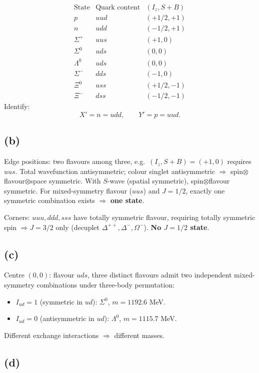 \documentclass[11pt]{article}
\begin{document}
\[ \begin{array}{l|c|c}
\text{State} & \text{Quark content} & (I_z, S+B) \\\hline
p & uud & (+1/2,+1) \\
n & udd & (-1/2,+1) \\
\Sigma^+ & uus & (+1,0) \\
\Sigma^0 & uds & (0,0) \\
\Lambda^0 & uds & (0,0) \\
\Sigma^- & dds & (-1,0) \\
\Xi^0 & uss & (+1/2,-1) \\
\Xi^- & dss & (-1/2,-1)
\end{array} \]
Identify:
\[ \boxed{\;X' = n = udd,\qquad Y' = p = uud.\;} \]

\subsection*{(b)}

Edge positions: two flavours among three, e.g.\ $(I_z,S+B)=(+1,0)$ requires $uus$. Total wavefunction antisymmetric; colour singlet antisymmetric $\Rightarrow$ spin$\otimes$flavour$\otimes$space symmetric. With $S$-wave (spatial symmetric), spin$\otimes$flavour symmetric. For mixed-symmetry flavour ($uus$) and $J=1/2$, exactly one symmetric combination exists $\Rightarrow$ \textbf{one state}.

Corners: $uuu, ddd, sss$ have totally symmetric flavour, requiring totally symmetric spin $\Rightarrow J=3/2$ only (decuplet $\Delta^{++},\Delta^-,\Omega^-$). \textbf{No $J=1/2$ state}.

\subsection*{(c)}

Centre $(0,0)$: flavour $uds$, three distinct flavours admit two independent mixed-symmetry combinations under three-body permutation:
\begin{itemize}
\item $I_{ud}=1$ (symmetric in $ud$): $\Sigma^0$, $m=1192.6$ MeV.
\item $I_{ud}=0$ (antisymmetric in $ud$): $\Lambda^0$, $m=1115.7$ MeV.
\end{itemize}
Different exchange interactions $\Rightarrow$ different masses.

\subsection*{(d)}
\end{document}
